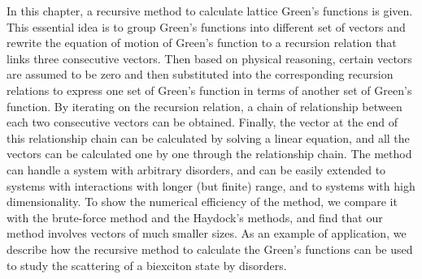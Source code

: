 In this chapter, a recursive method to calculate lattice Green's functions is given. This essential idea 
is to group Green's functions into different set of vectors and rewrite the equation of motion of Green's function to a 
recursion relation that links three consecutive vectors. Then based on physical reasoning, certain vectors are 
assumed to be zero and then substituted into the corresponding recursion relations to express one set
of Green's function in terms of another set of Green's function. By iterating on the recursion relation, a 
chain of relationship between each two consecutive vectors can be obtained. Finally, the vector at the end of this 
relationship chain can be calculated by solving a linear equation, and all the vectors can be calculated one by one
through the relationship chain.   
The method can handle a system with arbitrary 
disorders, and can be easily extended to systems with interactions with longer (but finite) range, and to systems with
high dimensionality. To show the numerical efficiency of the method, we compare it with the brute-force method and
the Haydock's methods, and find that our method involves vectors of much smaller sizes. As an example of
application, we describe how the recursive method to calculate the Green's functions can be used to study the 
scattering of a biexciton state by disorders. 
 
